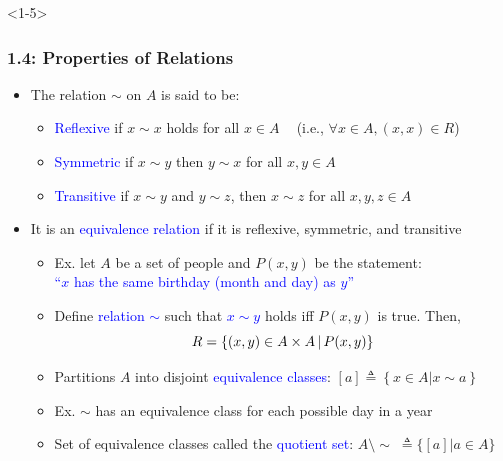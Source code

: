 \documentclass[10pt,english,aspectratio=169,handout]{beamer}
\begin{document}
\begin{frame}<1-5> \frametitle{1.4: Properties of Relations}

\begin{itemize}
\setlength\itemsep{5mm}
\item<1-> The relation $\sim$ on $A$ is said to be: \vspace{1mm}
\begin{itemize}
  \setlength\itemsep{1.5mm}
  \item \textcolor{blue}{Reflexive} if $x\sim x$ holds for all $x\in A$ $\;\;$ (i.e., $\forall x\in A, (x,x) \in R$)
  \item \textcolor{blue}{Symmetric} if $x\sim y$ then $y\sim x$ for all $x,y\in A$
  \item \textcolor{blue}{Transitive} if $x\sim y$ and $y\sim z$, then $x\sim z$ for all $x,y,z\in A$
\end{itemize}

\item<2-> It is an \textcolor{blue}{equivalence relation} if it is reflexive, symmetric, and transitive \vspace{1mm}

\begin{itemize}
  \setlength\itemsep{1.5mm}
  \item Ex. let $A$ be a set of people and $P(x,y)$ be the statement: \\ \textcolor{blue}{``$x$ has the same birthday (month and day) as $y$''}
  \item Define \textcolor{blue}{relation $\sim$} such that \textcolor{blue}{$x\sim y$} holds iff $P(x,y)$ is true.  Then, \vspace{-1mm}
  \[ R = \{ (x,y)\in A\times A \,|\, P(x,y) \} \vspace*{-1mm} \]
  \item<3-> Partitions $A$ into disjoint \textcolor{blue}{equivalence classes}: $[a] \triangleq \left\{x\in A | x \sim a\right\}$
  \item<4-> Ex. $\sim$ has an equivalence class for each possible day in a year
  \item<5-> Set of equivalence classes called the \textcolor{blue}{quotient set}: $A \setminus \!\sim \;\triangleq \{ [a] | a\in A \}$

\end{itemize}
\end{itemize}


\end{frame}
\end{document}
